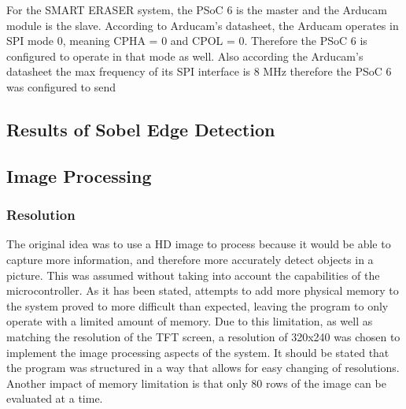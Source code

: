 \setlength{\parindent}{2.5ex} 
For the SMART ERASER system, the PSoC 6 is the master and the Arducam module is the slave. According to Arducam's datasheet, the Arducam operates in SPI mode 0, meaning CPHA = 0 and CPOL = 0. Therefore the PSoC 6 is configured to operate in that mode as well. Also according the Arducam's datasheet the max frequency of its SPI interface is 8 MHz therefore the PSoC 6 was configured to send 

\subsection{Results of Sobel Edge Detection}

\subsection{Image Processing}
\subsubsection{Resolution}
The original idea was to use a HD image to process because it would be able to capture more information, and therefore more accurately detect objects in a picture. This was assumed without taking into account the capabilities of the microcontroller. As it has been stated, attempts to add more physical memory to the system proved to more difficult than expected, leaving the program to only operate with a limited amount of memory. Due to this limitation, as well as matching the resolution of the TFT screen, a resolution of 320x240 was chosen to implement the image processing aspects of the system. It should be stated that the program was structured in a way that allows for easy changing of resolutions. Another impact of memory limitation is that only 80 rows of the image can be evaluated at a time.

